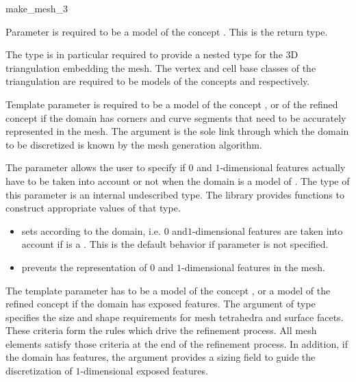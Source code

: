 \begin{ccRefFunction}{make_mesh_3}
\ccParameters

Parameter  is required to be a model of
the concept 
. This is the return type.

The type  is in particular required to provide a nested type
 for the 3D triangulation
embedding the mesh. The vertex and cell base classes of the
triangulation  are required to be models of the
concepts  and 
respectively.

Template parameter  is required to be a model of
the concept  , or of the refined concept
if the domain has corners and curve segments that need to be accurately represented in the mesh.
The argument  
 is the sole link through which the domain
to be discretized is known  by the mesh generation algorithm. 

The  parameter   allows
the user to specify if $0$ and $1$-dimensional features actually have to be
taken into account or not
 when the domain is a model of .
The type  of this parameter is an internal undescribed type.
The library provides functions to construct appropriate values of that type.
\begin{itemize}
\item {} sets  according to the domain,
  i.e. $0$ and$1$-dimensional features are taken into account if  is a
. This is the default behavior
if parameter  is not specified.
\item {} prevents the representation 
of $0$ and $1$-dimensional features in the mesh.
\end{itemize}

The template parameter  has to be a model of the concept
, or a model of  the refined concept  if the domain has exposed features.
The argument   of 
type   specifies the
size and shape requirements for  mesh tetrahedra
and  surface facets. These criteria
form the rules which drive the refinement process. All mesh elements
satisfy those criteria at the end of the refinement process.
In addition, if the domain has  features, the argument
 provides a sizing field to guide the discretization
of $1$-dimensional exposed features.




\end{ccRefFunction}
